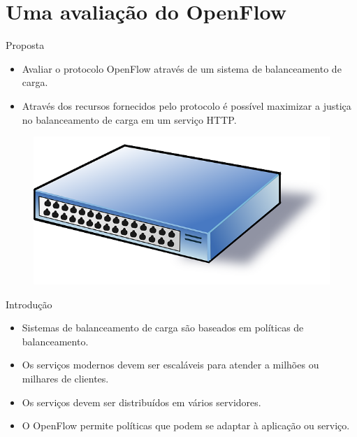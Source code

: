 \section{Uma avaliação do OpenFlow}

\begin{frame}{Proposta}

    \begin{itemize}
        \item Avaliar o protocolo OpenFlow através de um sistema de
            balanceamento de carga.
        \item Através dos recursos fornecidos pelo protocolo é possível 
            maximizar a justiça no balanceamento de carga em um serviço HTTP.
    \end{itemize}

    \begin{figure}[!htb]
        \centering
        \includegraphics[scale=.3]{images/cartoon-switch}
    \end{figure}
\end{frame}


\begin{frame}{Introdução}
    \begin{itemize}
        \setlength{\itemsep}{.5cm}
        \item Sistemas de balanceamento de carga são baseados em políticas 
            de balanceamento.
        \item Os serviços modernos devem ser escaláveis para atender a 
            milhões ou milhares de clientes.
        \item Os serviços devem ser distribuídos em vários servidores. 
        \item O OpenFlow permite políticas que podem se adaptar à aplicação 
            ou serviço.
    \end{itemize} 
\end{frame}
